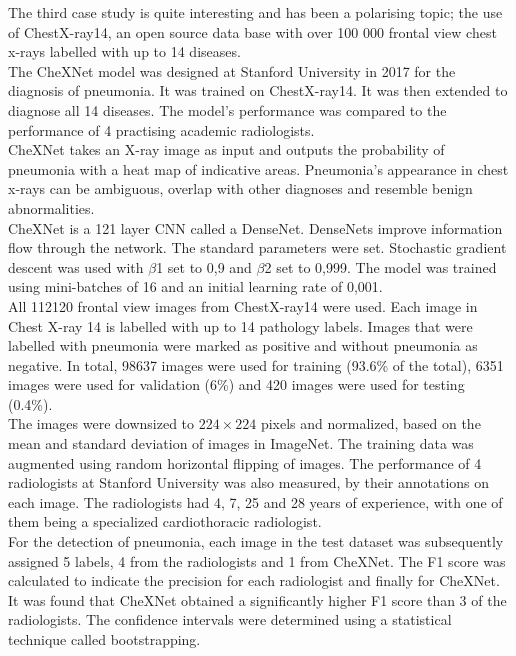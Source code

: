 The third case study is quite interesting and has been a polarising topic; the use of ChestX-ray14, an open source data base with over 100 000 frontal view chest x-rays labelled with up to 14 diseases.\newline
\\
The CheXNet model was designed at Stanford University in 2017 for the diagnosis of pneumonia. It was trained on ChestX-ray14. It was then extended to diagnose all 14 diseases. The model’s performance was compared to the performance of 4 practising academic radiologists.\newline
\\
CheXNet takes an X-ray image as input and outputs the probability of pneumonia with a heat map of indicative areas. Pneumonia’s appearance in chest x-rays can be ambiguous, overlap with other diagnoses and resemble benign abnormalities.\newline
\\
CheXNet is a 121 layer CNN called a DenseNet. DenseNets improve information flow through the network. The standard parameters were set. Stochastic gradient descent was used with $\beta$1 set to 0,9 and $\beta$2 set to 0,999. The model was trained using mini-batches of 16 and an initial learning rate of 0,001.\newline
\\
All 112120 frontal view images from ChestX-ray14 were used. Each image in Chest X-ray 14 is labelled with up to 14 pathology labels. Images that were labelled with pneumonia were marked as positive and without pneumonia as negative. In total, 98637 images were used for training (93.6\% of the total), 6351 images were used for validation (6\%) and 420 images were used for testing (0.4\%).\newline
\\
The images were downsized to $224\times224$ pixels and normalized, based on the mean and standard deviation of images in ImageNet. The training data was augmented using random horizontal flipping of images. The performance of 4 radiologists at Stanford University was also measured, by their annotations on each image. The radiologists had 4, 7, 25 and 28 years of experience, with one of them being a specialized cardiothoracic radiologist.\newline
\\
For the detection of pneumonia, each image in the test dataset was subsequently assigned 5 labels, 4 from the radiologists and 1 from CheXNet. The F1 score was calculated to indicate the precision for each radiologist and finally for CheXNet. It was found that CheXNet obtained a significantly higher F1 score than 3 of the radiologists. The confidence intervals were determined using a statistical technique called bootstrapping.\newline
